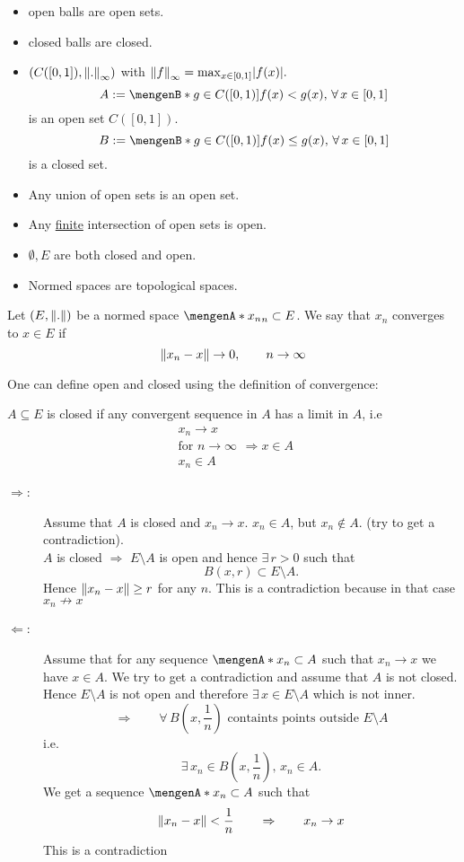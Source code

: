 \begin{bemerkung}
	\begin{itemize}
		\item open balls are open sets.
		\item closed balls are closed.
		\item $(C([0,1]),\norm{.}_{\infty})$ with $\norm{f}_{\infty}= \max_{x \in [0,1]}\abs{f(x)}.$ 
		\[
			A := \set[g \in C([0,1])]{f(x) < g(x),\,\forall\, x \in [0,1]}
		\]
		is an open set $C([0,1])$.
		\[
			B := \set[g \in C([0,1])]{f(x) \leq g(x),\,\forall\, x \in [0,1]}
 		\]
		is a closed set.
	\end{itemize}
	\begin{itemize}
		\item Any union of open sets is an open set.
		\item Any \underline{finite} intersection of open sets is open.
		\item $\emptyset,E$ are both closed and open.
		\item Normed spaces are topological spaces.
	\end{itemize}
\end{bemerkung}
\begin{definition*}
	Let $(E,\norm{.})$ be a normed space $\set{x_n}_n \subset E$. We say that $x_n$ converges to $x \in E$ if 
	\[
		\norm{x_n-x} \to 0, \qquad n \to \infty
	\]
\end{definition*}
One can define open and closed using the definition of convergence:
\begin{satz*} %
	$A \subseteq E$ is closed if any convergent sequence in $A$ has a limit in $A$, i.e
	\[
		\substack{x_n \to x \\ \text{for }n \to \infty \\ x_n \in A} \Rightarrow x \in A
	\]
\end{satz*}
\begin{beweis}
	\begin{description}
		\item[$\Rightarrow$:]Assume that $A$ is closed and $x_n \to x$. $x_n \in A$, but $x_n \not \in A$. (try to get a contradiction). \\
	 $A$ is closed $\Rightarrow $ $E \setminus A$ is open and hence $\exists\, r >0$ such that
	 \[
	 	B(x,r) \subset E \setminus A.
	 \]
	 Hence $\norm{x_n -x} \geq r$ for any $n$. This is a contradiction because in that case $x_n \not \to x$
	 \item[$\Leftarrow $:] Assume that for any sequence $\set{x_n} \subset A$ such that $x_n \to x$ we have $x \in A$. We try to get a contradiction and assume that $A$ is not closed. Hence $E \setminus A$ is not open and therefore $\exists\, x \in E \setminus A$ which is not inner.
	 \[
	 	\Rightarrow \qquad  \forall\, B(x,\frac{1}{n}) \text{ containts points outside }E \setminus A 
	 \]
	 i.e.
	 \[
	 	\exists\, x_n \in B(x, \frac{1}{n}), \, x_n \in A.
	 \]
	 We get a sequence $\set{x_n} \subset A$ such that
	 \[
	 	\norm{x_n-x} < \frac{1}{n} \qquad \Rightarrow \qquad x_n \to x
	 \]
	 This is a contradiction
	\end{description}
\end{beweis}
